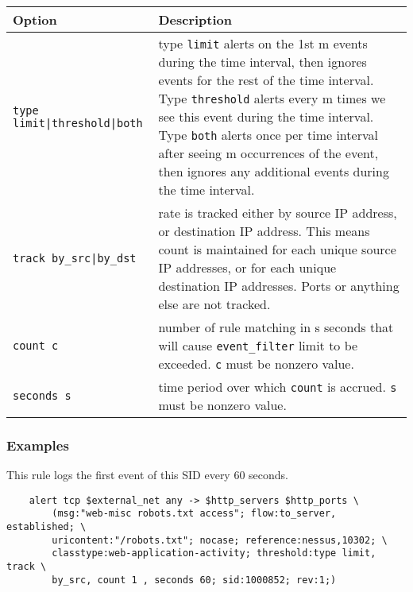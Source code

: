 \documentclass[english]{report}
\begin{document}
\begin{table}[h]
\begin{center}
\begin{tabular}{| l | p{4.5in} |}

\hline
\textbf{Option} & \textbf{Description}\\
\hline

\hline
\texttt{type limit|threshold|both} &

type \texttt{limit} alerts on the 1st m events during the time interval, then
ignores events for the rest of the time interval.  Type \texttt{threshold}
alerts every m times we see this event during the time interval.  Type
\texttt{both} alerts once per time interval after seeing m occurrences of the
event, then ignores any additional events during the time interval.\\

\hline
\texttt{track by\_src|by\_dst} &

rate is tracked either by source IP address, or destination IP address.  This
means count is maintained for each unique source IP addresses, or for each
unique destination IP addresses.  Ports or anything else are not tracked.\\

\hline
\texttt{count c} &

number of rule matching in s seconds that will cause \texttt{event\_filter}
limit to be exceeded.  \texttt{c} must be nonzero value.\\

\hline
\texttt{seconds s} &

time period over which \texttt{count} is accrued.  \texttt{s} must be nonzero
value.\\

\hline
\end{tabular}
\end{center}
\end{table}

\subsubsection{Examples}

This rule logs the first event of this SID every 60 seconds.

\begin{verbatim}
    alert tcp $external_net any -> $http_servers $http_ports \
        (msg:"web-misc robots.txt access"; flow:to_server, established; \
        uricontent:"/robots.txt"; nocase; reference:nessus,10302; \
        classtype:web-application-activity; threshold:type limit, track \
        by_src, count 1 , seconds 60; sid:1000852; rev:1;)
\end{verbatim}
\end{document}
